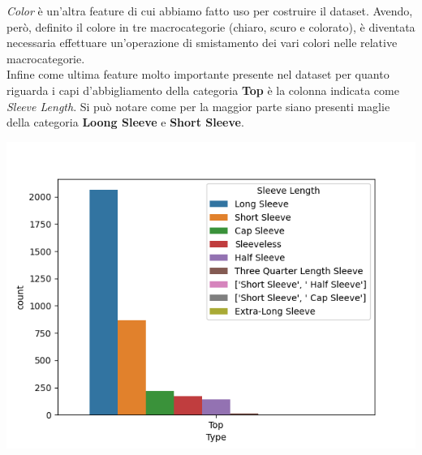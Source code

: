\documentclass[a4paper, 11pt, oneside]{report}
\begin{document}
                \bigskip
                \par \noindent \textit{Color} è un'altra feature di cui abbiamo fatto uso per costruire il dataset. Avendo,
                però, definito il colore in tre macrocategorie (chiaro, scuro e colorato), è diventata necessaria effettuare
                un'operazione di smistamento dei vari colori nelle relative macrocategorie.
                \\ \noindent Infine come ultima feature molto importante presente nel dataset per quanto riguarda i capi
                d'abbigliamento della categoria \textbf{Top} è la colonna indicata come \textit{Sleeve Length}. Si può
                notare come per la maggior parte siano presenti maglie della categoria \textbf{Loong Sleeve} e
                \textbf{Short Sleeve}.
                \begin{center}
                    \includegraphics[scale=0.4]{countLengthTop}
                \end{center}
\end{document}
